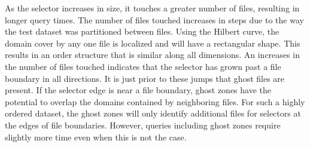 \documentclass[apjl]{emulateapj}
\begin{document}
As the selector increases in size, it touches a greater number of files, resulting in longer query times. The number of files touched increases in steps due to the way the test dataset was partitioned between files. Using the Hilbert curve, the domain cover by any one file is localized and will have a rectangular shape. This results in an order structure that is similar along all dimensions. An increases in the number of files touched indicates that the selector has grown past a file boundary in all directions. It is just prior to these jumps that ghost files are present. If the selector edge is near a file boundary, ghost zones have the potential to overlap the domains contained by neighboring files. For such a highly ordered dataset, the ghost zones will only identify additional files for selectors at the edges of file boundaries. However, queries including ghost zones require slightly more time even when this is not the case.


\end{document}
